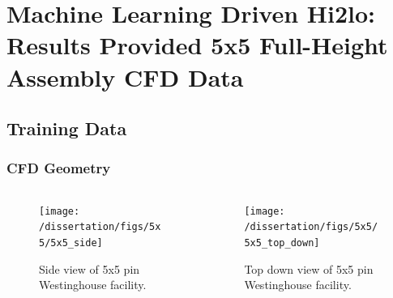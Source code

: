 \documentclass[t, pdftex]{beamer}
\begin{document}
\section[ML Results]{Machine Learning Driven Hi2lo: Results Provided 5x5 Full-Height Assembly CFD Data}
\subsection*{Training Data}
\begin{frame}
\frametitle{CFD Geometry}
\vspace*{-32pt}
\begin{columns}
    \begin{column}{0.5\textwidth}
\begin{figure}[H]
    \centering
    \texttt{[image: /dissertation/figs/5x5/5x5\_side]}
    \caption{\centering Side view of 5x5 pin \\ Westinghouse facility.}
    \label{fig:5x5side}
\end{figure}
    \end{column}
\begin{column}{0.5\textwidth}
\begin{figure}[H]
    \centering
    \texttt{[image: /dissertation/figs/5x5/5x5\_top\_down]}
    \caption{\centering Top down view of 5x5 pin \\ Westinghouse facility.}
    \label{fig:5x5topdown}
\end{figure}
\end{column}
\end{columns}
\cite{salko17}
\end{frame}

\end{document}
